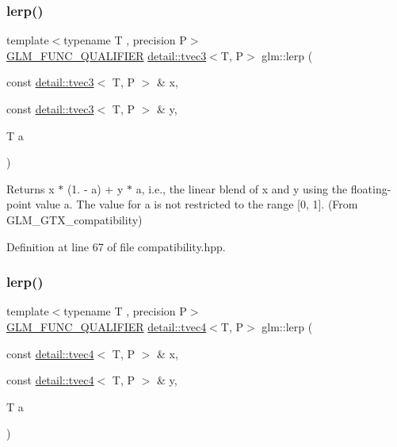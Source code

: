 \subsubsection{\texorpdfstring{lerp()}{lerp()}\hspace{0.1cm}{\footnotesize\ttfamily [3/7]}}
{\footnotesize\ttfamily template$<$typename T , precision P$>$ \\
\hyperlink{setup_8hpp_a33fdea6f91c5f834105f7415e2a64407}{G\+L\+M\+\_\+\+F\+U\+N\+C\+\_\+\+Q\+U\+A\+L\+I\+F\+I\+ER} \hyperlink{structglm_1_1detail_1_1tvec3}{detail\+::tvec3}$<$T, P$>$ glm\+::lerp (\begin{DoxyParamCaption}\item[{const \hyperlink{structglm_1_1detail_1_1tvec3}{detail\+::tvec3}$<$ T, P $>$ \&}]{x,  }\item[{const \hyperlink{structglm_1_1detail_1_1tvec3}{detail\+::tvec3}$<$ T, P $>$ \&}]{y,  }\item[{T}]{a }\end{DoxyParamCaption})}



Returns x $\ast$ (1. -\/ a) + y $\ast$ a, i.\+e., the linear blend of x and y using the floating-\/point value a. The value for a is not restricted to the range \mbox{[}0, 1\mbox{]}. (From G\+L\+M\+\_\+\+G\+T\+X\+\_\+compatibility) 



Definition at line 67 of file compatibility.\+hpp.

\mbox{\label{group__gtx__compatibility_ga063de7edddb13ecc44fcfddd9bf38111}} 
\subsubsection{\texorpdfstring{lerp()}{lerp()}\hspace{0.1cm}{\footnotesize\ttfamily [4/7]}}
{\footnotesize\ttfamily template$<$typename T , precision P$>$ \\
\hyperlink{setup_8hpp_a33fdea6f91c5f834105f7415e2a64407}{G\+L\+M\+\_\+\+F\+U\+N\+C\+\_\+\+Q\+U\+A\+L\+I\+F\+I\+ER} \hyperlink{structglm_1_1detail_1_1tvec4}{detail\+::tvec4}$<$T, P$>$ glm\+::lerp (\begin{DoxyParamCaption}\item[{const \hyperlink{structglm_1_1detail_1_1tvec4}{detail\+::tvec4}$<$ T, P $>$ \&}]{x,  }\item[{const \hyperlink{structglm_1_1detail_1_1tvec4}{detail\+::tvec4}$<$ T, P $>$ \&}]{y,  }\item[{T}]{a }\end{DoxyParamCaption})}



